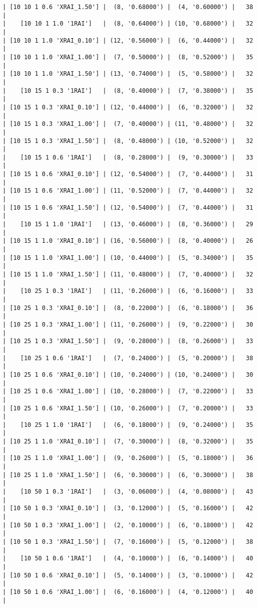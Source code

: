 \documentclass{article}
\begin{document}
\begin{verbatim}
| [10 10 1 0.6 'XRAI_1.50'] |  (8, '0.68000') |  (4, '0.60000') |   38  |
|    [10 10 1 1.0 '1RAI']   |  (8, '0.64000') | (10, '0.68000') |   32  |
| [10 10 1 1.0 'XRAI_0.10'] | (12, '0.56000') |  (6, '0.44000') |   32  |
| [10 10 1 1.0 'XRAI_1.00'] |  (7, '0.50000') |  (8, '0.52000') |   35  |
| [10 10 1 1.0 'XRAI_1.50'] | (13, '0.74000') |  (5, '0.58000') |   32  |
|    [10 15 1 0.3 '1RAI']   |  (8, '0.40000') |  (7, '0.38000') |   35  |
| [10 15 1 0.3 'XRAI_0.10'] | (12, '0.44000') |  (6, '0.32000') |   32  |
| [10 15 1 0.3 'XRAI_1.00'] |  (7, '0.40000') | (11, '0.48000') |   32  |
| [10 15 1 0.3 'XRAI_1.50'] |  (8, '0.48000') | (10, '0.52000') |   32  |
|    [10 15 1 0.6 '1RAI']   |  (8, '0.28000') |  (9, '0.30000') |   33  |
| [10 15 1 0.6 'XRAI_0.10'] | (12, '0.54000') |  (7, '0.44000') |   31  |
| [10 15 1 0.6 'XRAI_1.00'] | (11, '0.52000') |  (7, '0.44000') |   32  |
| [10 15 1 0.6 'XRAI_1.50'] | (12, '0.54000') |  (7, '0.44000') |   31  |
|    [10 15 1 1.0 '1RAI']   | (13, '0.46000') |  (8, '0.36000') |   29  |
| [10 15 1 1.0 'XRAI_0.10'] | (16, '0.56000') |  (8, '0.40000') |   26  |
| [10 15 1 1.0 'XRAI_1.00'] | (10, '0.44000') |  (5, '0.34000') |   35  |
| [10 15 1 1.0 'XRAI_1.50'] | (11, '0.48000') |  (7, '0.40000') |   32  |
|    [10 25 1 0.3 '1RAI']   | (11, '0.26000') |  (6, '0.16000') |   33  |
| [10 25 1 0.3 'XRAI_0.10'] |  (8, '0.22000') |  (6, '0.18000') |   36  |
| [10 25 1 0.3 'XRAI_1.00'] | (11, '0.26000') |  (9, '0.22000') |   30  |
| [10 25 1 0.3 'XRAI_1.50'] |  (9, '0.28000') |  (8, '0.26000') |   33  |
|    [10 25 1 0.6 '1RAI']   |  (7, '0.24000') |  (5, '0.20000') |   38  |
| [10 25 1 0.6 'XRAI_0.10'] | (10, '0.24000') | (10, '0.24000') |   30  |
| [10 25 1 0.6 'XRAI_1.00'] | (10, '0.28000') |  (7, '0.22000') |   33  |
| [10 25 1 0.6 'XRAI_1.50'] | (10, '0.26000') |  (7, '0.20000') |   33  |
|    [10 25 1 1.0 '1RAI']   |  (6, '0.18000') |  (9, '0.24000') |   35  |
| [10 25 1 1.0 'XRAI_0.10'] |  (7, '0.30000') |  (8, '0.32000') |   35  |
| [10 25 1 1.0 'XRAI_1.00'] |  (9, '0.26000') |  (5, '0.18000') |   36  |
| [10 25 1 1.0 'XRAI_1.50'] |  (6, '0.30000') |  (6, '0.30000') |   38  |
|    [10 50 1 0.3 '1RAI']   |  (3, '0.06000') |  (4, '0.08000') |   43  |
| [10 50 1 0.3 'XRAI_0.10'] |  (3, '0.12000') |  (5, '0.16000') |   42  |
| [10 50 1 0.3 'XRAI_1.00'] |  (2, '0.10000') |  (6, '0.18000') |   42  |
| [10 50 1 0.3 'XRAI_1.50'] |  (7, '0.16000') |  (5, '0.12000') |   38  |
|    [10 50 1 0.6 '1RAI']   |  (4, '0.10000') |  (6, '0.14000') |   40  |
| [10 50 1 0.6 'XRAI_0.10'] |  (5, '0.14000') |  (3, '0.10000') |   42  |
| [10 50 1 0.6 'XRAI_1.00'] |  (6, '0.16000') |  (4, '0.12000') |   40  |

\end{verbatim}
\end{document}
